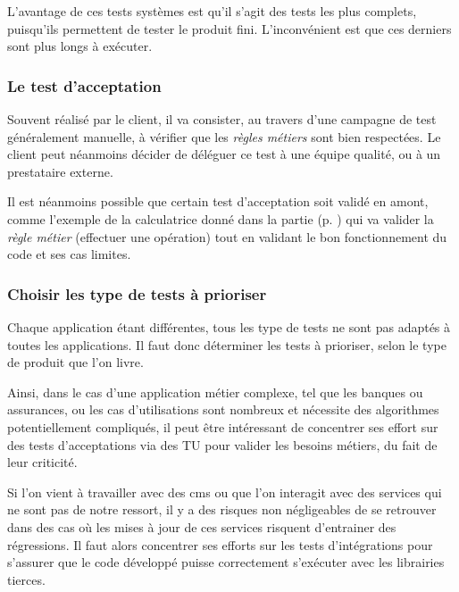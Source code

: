 L'avantage de ces tests systèmes est qu'il s'agit des tests les plus complets, puisqu'ils permettent de tester le produit fini. L'inconvénient est que ces derniers sont plus longs à exécuter.


\subsubsection{Le test d'acceptation}\label{test-acceptation}

Souvent réalisé par le client, il va consister, au travers d'une campagne de test généralement manuelle, à vérifier que les \emph{règles métiers} sont bien respectées. Le client peut néanmoins décider de déléguer ce test à une équipe qualité, ou à un prestataire externe.

Il est néanmoins possible que certain test d'acceptation soit validé en amont, comme l'exemple de la calculatrice donné dans la partie  (p. \pageref{test-composant}) qui va valider la \emph{règle métier} (effectuer une opération) tout en validant le bon fonctionnement du code et ses cas limites.

\subsubsection{Choisir les type de tests à prioriser}

Chaque application étant différentes, tous les type de tests ne sont pas adaptés à toutes les applications. Il faut donc déterminer les tests à prioriser, selon le type de produit que l'on livre.

Ainsi, dans le cas d'une application métier complexe, tel que les banques ou assurances, ou les cas d'utilisations sont nombreux et nécessite des algorithmes potentiellement compliqués, il peut être intéressant de concentrer ses effort sur des tests d'acceptations via des \gls{TU} pour valider les besoins métiers, du fait de leur criticité.

Si l'on vient à travailler avec des \gls{cms} ou que l'on interagit avec des services qui ne sont pas de notre ressort, il y a des risques non négligeables de se retrouver dans des cas où les mises à jour de ces services risquent d'entrainer des régressions. Il faut alors concentrer ses efforts sur les tests d'intégrations pour s'assurer que le code développé puisse correctement s'exécuter avec les librairies tierces.

